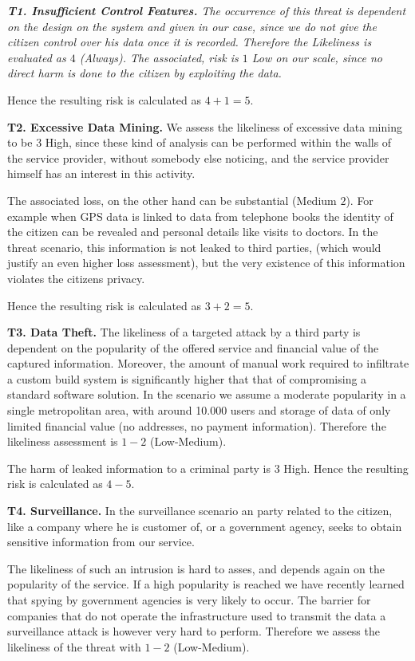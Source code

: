 \documentclass[runningheads,a4paper]{llncs}
\newenvironment{LGContent}
{ \par\color{blue} \it \small }
{ \par }
\begin{document}
\begin{LGContent}
\textbf{T1. Insufficient Control Features.}  The occurrence of this
threat is dependent on the design on the system and given in our case,
since we do not give the citizen control over his data once it is
recorded. Therefore the Likeliness is evaluated as $4$ (Always).  The
associated, risk is $1$ Low on our scale, since no direct harm is done to
the citizen by exploiting the data.

Hence the resulting risk is calculated as $4+1 = 5$.

\textbf{T2. Excessive Data Mining.}
We assess the likeliness of excessive data mining to be $3$ High, since
these kind of analysis can be performed within the walls of the service
provider, without somebody else noticing, and the service provider himself
has an interest in this activity.

The associated loss, on the other hand can be substantial (Medium
$2$).  For example when GPS data is linked to data from telephone
books the identity of the citizen can be revealed and personal details
like visits to doctors. In the threat scenario, this information is
not leaked to third parties, (which would justify an even higher loss
assessment), but the very existence of this information violates the
citizens privacy.

Hence the resulting risk is calculated as $3+2 = 5$.

\textbf{T3. Data Theft.}
The likeliness of a targeted attack by a third party is dependent on
the popularity of the offered service and financial value of the
captured information. Moreover, the amount of manual work required to
infiltrate a custom build system is significantly higher that that of
compromising a standard software solution. In the scenario we assume a
moderate popularity in a single metropolitan area, with around 10.000
users and storage of data of only limited financial value (no
addresses, no payment information). Therefore the likeliness
assessment is $1-2$ (Low-Medium).

The harm of leaked information to a criminal party is $3$ High.
Hence the resulting risk is calculated as $4-5$.

\textbf{T4. Surveillance.}  In the surveillance scenario an party
related to the citizen, like a company where he is customer of, or a
government agency, seeks to obtain sensitive information from our
service.

The likeliness of such an intrusion is hard to asses, and depends
again on the popularity of the service. If a high popularity is
reached we have recently learned that spying by government agencies is
very likely to occur. The barrier for companies that do not operate
the infrastructure used to transmit the data a surveillance attack is
however very hard to perform. Therefore we assess the likeliness of
the threat with $1-2$ (Low-Medium).


\end{LGContent}
\end{document}
